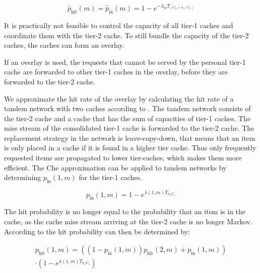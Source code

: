 \begin{equation}
\hat p_\text{hit}(m)=\hat p_\text{in}(m)=1-e^{-\lambda_{m}T_{(C_2+n_1\cdot C_{1})}}
\end{equation}

It is practically not feasible to control the capacity of all tier-1 caches and coordinate them with the tier-2 cache.
To still bundle the capacity of the tier-2 caches, the caches can form an overlay.




If an overlay is used, the requests that cannot be served by the personal tier-1 cache are forwarded to other tier-1 caches in the overlay, before they are forwarded to the tier-2 cache.

We approximate the hit rate of the overlay by calculating the hit rate of a tandem network with two caches according to \cite{martina2014unified}. The tandem network consists of the tier-2 cache and a cache that has the sum of capacities of tier-1 caches. The miss stream of the consolidated tier-1 cache is forwarded to the tier-2 cache.
The replacement strategy in the network is leave-copy-down, that means that an item is only placed in a cache if it is found in a higher tier cache. Thus only frequently requested items are propagated to lower tier-caches, which makes them more efficient. The Che approximation can be applied to tandem networks by determining $p_\text{in}(1,m)$ for the tier-1 caches.

\begin{equation}
p_\text{in}(1,m) = 1-e^{\lambda(1,m)T_{n_1 C_1}}
\end{equation}

The hit probability is no longer equal to the probability that an item is in the cache, as the cache miss stream arriving at the tier-2 cache is no longer Markov. According to \cite{martina2014unified} the hit probability can then be determined by:

\begin{multline}
p_\text{hit}(1,m) = ((1-p_\text{in}(1,m))p_\text{hit}(2,m) + p_\text{in}(1,m)) \\ \cdot(1-e^{\lambda(1,m)T_{n_1 C_1}})
\end{multline}

